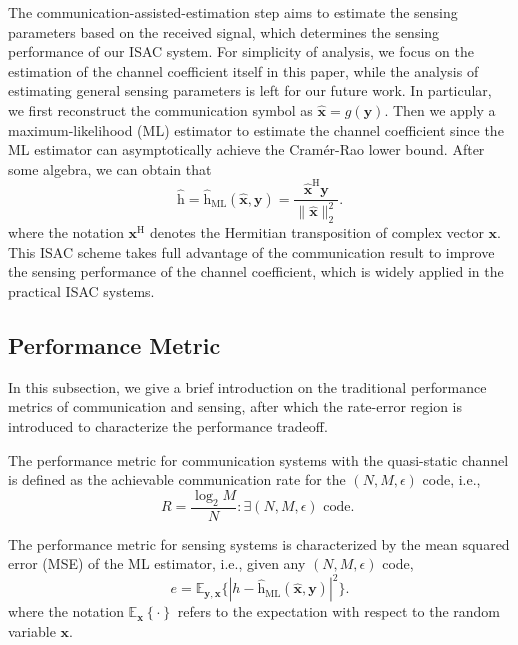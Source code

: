 \documentclass[conference,a4paper]{IEEEtran}
\newcommand{\V}[1]{\bm{#1}} %
\begin{document}
The communication-assisted-estimation step aims to estimate the sensing parameters based on the received signal, which determines the sensing performance of our ISAC system. For simplicity of analysis, we focus on the estimation of the channel coefficient itself in this paper, while the analysis of estimating general sensing parameters is left for our future work. In particular, we first reconstruct the communication symbol as $\hat{\mathbf{x}} = g(\mathbf{y})$. Then we apply a maximum-likelihood (ML) estimator to estimate the channel coefficient since the ML estimator can asymptotically achieve the Cram\'er-Rao lower bound\cite{VanBel:B68}. After some algebra, we can obtain that
\begin{equation}
\label{ML-estimator}
     \hat{\mathrm{h}} = \hat{\mathrm{h}}_\mathrm{ML}(\hat{\mathbf{x}},\mathbf{y}) = \frac{\hat{\mathbf{x}}^\mathrm{H}\mathbf{y}}{\|\hat{\mathbf{x}}\|_2^2}.
\end{equation}
where the notation $\V{x}^\mathrm{H}$ denotes the Hermitian transposition of complex vector $\V{x}$. This ISAC scheme takes full advantage of the communication result to improve the sensing performance of the channel coefficient, which is widely applied in the practical ISAC systems\cite{ZhaLiuMas:J21}.
\subsection{Performance Metric}
In this subsection, we give a brief introduction on the traditional performance metrics of communication and sensing, after which the rate-error region is introduced to characterize the performance tradeoff. 

The performance metric for communication systems with the quasi-static channel is defined as the achievable communication rate for the $(N,M,\epsilon)$ code, i.e.,
\begin{equation}
    R = \frac{\log_2 M}{N}: \exists(N, M, \epsilon) \text { code. }
\end{equation}


The performance metric for sensing systems is characterized by the mean squared error (MSE) of the ML estimator, i.e., given any $(N, M, \epsilon)$ code, 
\begin{equation}
\label{MSE}
    e = \mathbb{E}_{\mathbf{y},\mathbf{x}}\bigg\{|h-\hat{\mathrm{h}}_\mathrm{ML}(\hat{\mathbf{x}},\mathbf{y})|^2\bigg\}.
\end{equation}
where the notation $\mathbb{E}_{\mathbf{x}}\left\{\cdot\right\}$ refers to the expectation with respect to the random variable $\mathbf{x}$.
\end{document}
